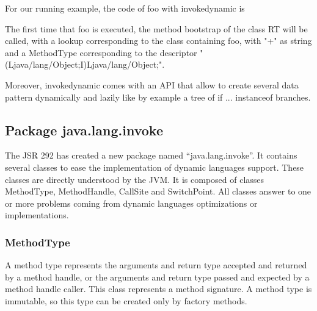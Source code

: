\documentclass{sigplanconf}
\def \Jsr{JSR\xspace}
\def \JSR{\Jsr 292\xspace}
\def \JVM{JVM\xspace}
\begin{document}
      For our running example, the code of foo with invokedynamic is

      

      The first time that foo is executed, the method bootstrap of the class RT will be called, with a lookup corresponding to the class containing foo,
      with "+" as string and a MethodType corresponding to the descriptor "(Ljava/lang/Object;I)Ljava/lang/Object;".

      

      Moreover, invokedynamic comes with an API that allow to create several data pattern
      dynamically and lazily like by example a tree of if ... instanceof branches.

      \begin{figure}
        \centering \resizebox{.6\linewidth}{!}{}
        \caption{}
      \end{figure}

      \begin{figure}
        \centering \resizebox{\linewidth}{!}{}
        \caption{}
      \end{figure}

      \begin{figure}
        \centering \resizebox{.8\linewidth}{!}{}
        \caption{}
      \end{figure}


    \subsection{Package java.lang.invoke}
      The \JSR has created a new package named ``java.lang.invoke''.
      It contains several classes to ease the implementation of dynamic languages support.
      These classes are directly understood by the \JVM.
      It is composed of classes MethodType, MethodHandle, CallSite and SwitchPoint.
      All classes answer to one or more problems coming from dynamic languages optimizations or implementations.

      \subsubsection{MethodType}
        A method type represents the arguments and return type accepted and returned by a method handle,
        or the arguments and return type passed and expected by a method handle caller.
        This class represents a method signature.
        A method type is immutable, so this type can be created only by factory methods.
        
\end{document}
